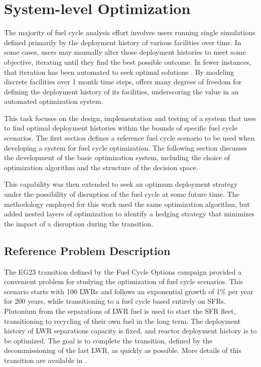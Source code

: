 \section{System-level Optimization}\label{section:system}

The majority of fuel cycle analysis effort involves users running single
simulations defined primarily by the deployment history of various facilities
over time.  In some cases, users may manually alter those deployment histories
to meet some objective, iterating until they find the best possible outcome.
In fewer instances, that iteration has been automated to seek optimal
solutions .  By modeling discrete facilities over 1 month time
steps, \Cyclus{} offers many degrees of freedom for defining the deployment
history of its facilities, underscoring the value in an automated optimization
system.

This task focuses on the design, implementation and testing of a system that
uses \Cyclus{} to find optimal deployment histories within the bounds of
specific fuel cycle scenarios.  The first section defines a reference fuel
cycle scenario to be used when developing a system for fuel cycle
optimization.  The following section discusses the development of the basic
optimization system, including the choice of optimization algorithm and the
structure of the decision space.

This capability was then extended to seek an optimum deployment strategy under
the possibility of disruption of the fuel cycle at some future time.  The
methodology employed for this work used the same optimization algorithm, but
added nested layers of optimization to identify a hedging strategy that
minimizes the impact of a disruption during the transition.

\subsection{Reference Problem Description}

The EG23 transition defined by the Fuel Cycle Options campaign provided a
convenient problem for studying the optimization of fuel cycle scenarios.
This scenario starts with 100 \gls{LWR}s and follows an exponential growth of
  1\% per year for 200 years, while transitioning to a fuel cycle based
  entirely on \gls{SFR}s.  Plutonium from the separations of \gls{LWR} fuel is
  used to start the \gls{SFR} fleet, transitioning to recycling of their own
  fuel in the long term.  The deployment history of \gls{LWR} separations
  capacity is fixed, and reactor deployment history is to be optimized.  The
  goal is to complete the transition, defined by the decommissioning of the
  last \gls{LWR}, as quickly as possible.  More details of this transition are
  available in .


